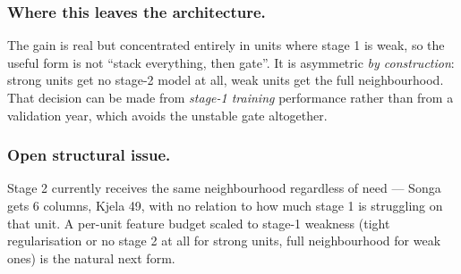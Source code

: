 \subsubsection*{Where this leaves the architecture.}
The gain is real but concentrated entirely in units where stage 1 is weak, so the useful form is
not ``stack everything, then gate''. It is asymmetric \emph{by construction}: strong units get no
stage-2 model at all, weak units get the full neighbourhood. That decision can be made from
\emph{stage-1 training} performance rather than from a validation year, which avoids the unstable
gate altogether.

\subsubsection*{Open structural issue.} Stage 2 currently receives the same neighbourhood
regardless of need --- Songa gets 6 columns, Kjela 49, with no relation to how much stage 1 is
struggling on that unit. A per-unit feature budget scaled to stage-1 weakness (tight regularisation
or no stage 2 at all for strong units, full neighbourhood for weak ones) is the natural next form.
